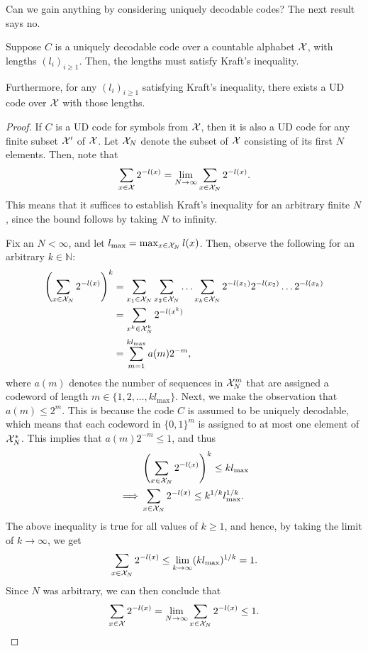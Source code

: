     Can we gain anything by considering uniquely decodable codes? The next result says no. 
    \begin{theorem}
        \label{thm:kraft-ud-1} 
        Suppose $C$ is a uniquely decodable code over a countable alphabet $\mathcal{X}$, with lengths $(l_i)_{i \geq 1}$. Then, the lengths must satisfy Kraft's inequality. 

        Furthermore, for any $(l_i)_{i \geq 1}$ satisfying Kraft's inequality, there exists a UD code over $\mathcal{X}$ with those lengths. 
    \end{theorem}


    \begin{proof}
        If $C$ is a UD code for symbols from $\mathcal{X}$, then it is also a UD code for any finite subset $\mathcal{X}'$ of $\mathcal{X}$. Let $\mathcal{X}_N$ denote the subset of $\mathcal{X}$ consisting of its first $N$ elements. Then, note that 
        \begin{align}
            \sum_{x \in \mathcal{X}} 2^{-l(x)} = \lim_{N \to \infty} \sum_{x \in \mathcal{X}_N} 2^{-l(x)}. 
        \end{align}
        This means that it suffices to establish Kraft's inequality for an arbitrary finite $N$, since the bound follows by taking $N$ to infinity. 

        Fix an $N< \infty$, and let $l_{\max} = \max_{x \in \mathcal{X}_N} l(x)$. Then, observe the following for an arbitrary $k \in \mathbb{N}$: 
        \begin{align}
            \left( \sum_{x \in \mathcal{X}_N} 2^{-l(x)} \right) ^k &= \sum_{x_1 \in \mathcal{X}_N} \sum_{x_2 \in \mathcal{X}_N}\ldots \sum_{x_k \in \mathcal{X}_N} 2^{- l(x_1)}2^{- l(x_2)} \ldots 2^{- l(x_k)} \\ 
            & = \sum_{x^k \in \mathcal{X}_N^k} 2^{-l(x^k)} \\
            & = \sum_{m=1}^{k l_{\max}} a(m) 2^{-m}, 
        \end{align}
        where $a(m)$ denotes the number of sequences in $\mathcal{X}_N^m$ that are assigned a codeword of length $m \in \{1, 2, \ldots, k l_{\max} \}$.  Next, we make the observation that $a(m) \leq 2^m$. This is because the code $C$ is assumed to be uniquely decodable, which means that each codeword in $\{0, 1\}^m$ is assigned to at most one element of $\mathcal{X}_N^*$. This implies that $a(m)  2^{-m} \leq 1$, and thus 
        \begin{align}
            &\left( \sum_{x \in \mathcal{X}_N} 2^{-l(x)} \right)^{k} \leq k l_{\max} \\
            \implies & \sum_{x \in \mathcal{X}_N} 2^{-l(x)} \leq k^{1/k} l_{\max}^{1/k}. 
        \end{align}
        The above inequality is true for all values of $k \geq 1$, and hence, by taking the limit of $k \to \infty$, we get 
        \begin{align}
            \sum_{x \in \mathcal{X}_N} 2^{-l(x)} \leq \lim_{k \to \infty} (k l_{\max})^{1/k} = 1. 
        \end{align}
        Since $N$ was arbitrary, we can then conclude that 
        \begin{align}
            \sum_{x \in \mathcal{X}}2^{-l(x)} = \lim_{N \to \infty} \sum_{x \in \mathcal{X}_N} 2^{-l(x)} \leq 1. 
        \end{align}
    \end{proof}

